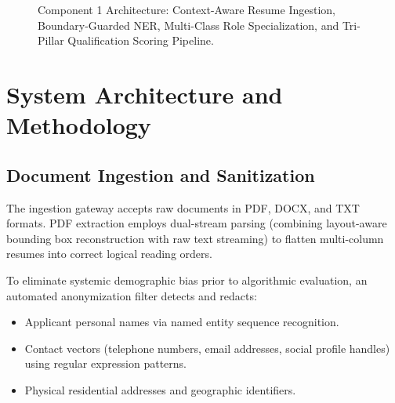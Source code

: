 \documentclass[conference]{IEEEtran}
\begin{document}
\begin{figure}[t]
\caption{Component 1 Architecture: Context-Aware Resume Ingestion, Boundary-Guarded NER, Multi-Class Role Specialization, and Tri-Pillar Qualification Scoring Pipeline.}
\label{fig:c1_pipeline}
\end{figure}

\section{System Architecture and Methodology}

\subsection{Document Ingestion and Sanitization}
The ingestion gateway accepts raw documents in PDF, DOCX, and TXT formats. PDF extraction employs dual-stream parsing (combining layout-aware bounding box reconstruction with raw text streaming) to flatten multi-column resumes into correct logical reading orders. 

To eliminate systemic demographic bias prior to algorithmic evaluation, an automated anonymization filter detects and redacts:
\begin{itemize}
    \item Applicant personal names via named entity sequence recognition.
    \item Contact vectors (telephone numbers, email addresses, social profile handles) using regular expression patterns.
    \item Physical residential addresses and geographic identifiers.
\end{itemize}
\end{document}
